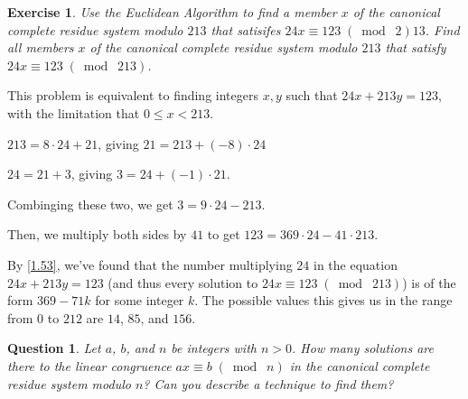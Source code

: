 \documentclass{article}
\newtheorem{ques}[thm]{Question}
\newtheorem{ex}[thm]{Exercise}
\numberwithin{equation}{thm}
\providecommand{\gmod}[1]{\; (\bmod \; #1)}
\begin{document}
\begin{ex} \label{3.22}
  Use the Euclidean Algorithm to find a member $x$ of the canonical complete residue system modulo $213$ that satisifes $24x \equiv 123 \gmod 213$. Find all members $x$ of the canonical complete residue system modulo $213$ that satisfy $24x \equiv 123 \gmod{213}$.
\end{ex}

This problem is equivalent to finding integers $x, y$ such that $24x + 213y = 123$, with the limitation that $0 \leq x < 213$.

$213 = 8 \cdot 24 + 21$, giving $21 = 213 + (-8) \cdot 24$

$24 = 21 + 3$, giving $3 = 24 + (-1) \cdot 21$.

Combinging these two, we get $3 = 9 \cdot 24 - 213$.

Then, we multiply both sides by $41$ to get $123 = 369 \cdot 24 - 41 \cdot 213$.

By \ref{1.53}, we've found that the number multiplying $24$ in the equation $24x + 213y = 123$ (and thus every solution to $24x \equiv 123 \gmod{213}$) is of the form $369 - 71k$ for some integer $k$. The possible values this gives us in the range from $0$ to $212$ are $14$, $85$, and $156$.



\begin{ques} \label{3.23}
  Let $a$, $b$, and $n$ be integers with $n > 0$. How many solutions are there to the linear congruence $ax \equiv b \gmod n$ in the canonical complete residue system modulo $n$? Can you describe a technique to find them?
\end{ques}
\end{document}
